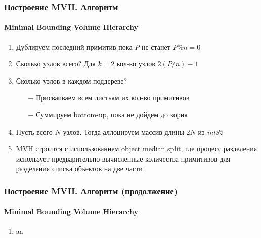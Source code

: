 \documentclass{beamer}
\begin{document}
\begin{frame}
    \frametitle{Построение MVH. Алгоритм}
    \framesubtitle{Minimal Bounding Volume Hierarchy}
    \begin{enumerate}
        \item
            Дублируем последний примитив пока $P$ не станет $ P \% n = 0$
        \item
            Сколько узлов всего? Для $k = 2$ кол-во узлов $2(P/n) -1$
        \item
            Сколько узлов в каждом поддереве?
            \begin{itemize}
                \item[$-$]
                    Присваиваем всем листьям их кол-во примитивов
                \item[$-$]
                    Суммируем bottom-up, пока не дойдем до корня
            \end{itemize}
        \item
            Пусть всего $N$ узлов. Тогда аллоцируем массив длины $2N$ из \textit{int32}
        \item
            MVH строится с использованием object median split, где
            процесс разделения использует предварительно вычисленные количества примитивов для
            разделения списка объектов на две части
    \end{enumerate}
    
\end{frame}

\begin{frame}
    \frametitle{Построение MVH. Алгоритм (продолжение)}
    \framesubtitle{Minimal Bounding Volume Hierarchy}
    \begin{enumerate}
        \item 
            aa
    \end{enumerate}
\end{frame}
\end{document}
